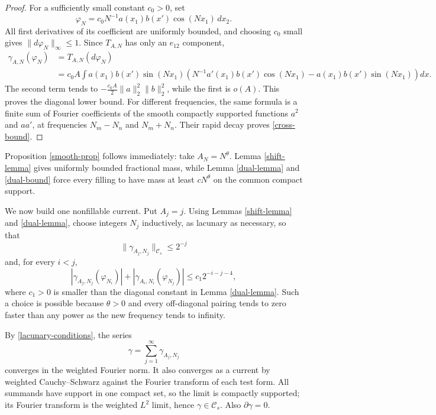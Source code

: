 \documentclass[11pt]{article}
\newcommand{\Cs}{\mathcal{C}_s}
\begin{document}
\begin{proof}
For a sufficiently small constant $c_0>0$, set
\[
 \varphi_N=c_0N^{-1}a(x_1)b(x')\cos(Nx_1)\,dx_2.
\]
All first derivatives of its coefficient are uniformly bounded, and choosing
$c_0$ small gives $\|d\varphi_N\|_\infty\le1$.  Since $T_{A,N}$ has only an
$e_{12}$ component,
\begin{align*}
 \gamma_{A,N}(\varphi_N)
 &=T_{A,N}(d\varphi_N)\\
 &=c_0A\int a(x_1)b(x')\sin(Nx_1)
 \left(N^{-1}a'(x_1)b(x')\cos(Nx_1)
       -a(x_1)b(x')\sin(Nx_1)\right)dx.
\end{align*}
The second term tends to
$-\frac{c_0A}{2}\|a\|_2^2\|b\|_2^2$, while the first is $o(A)$.
This proves the diagonal lower bound.  For different frequencies, the same
formula is a finite sum of Fourier coefficients of the smooth compactly
supported functions $a^2$ and $aa'$, at frequencies
$N_m-N_n$ and $N_m+N_n$.  Their rapid decay proves
\eqref{cross-bound}.
\end{proof}

Proposition \ref{smooth-prop} follows immediately: take
$A_N=N^\theta$.  Lemma \ref{shift-lemma} gives uniformly bounded fractional
mass, while Lemma \ref{dual-lemma} and \eqref{dual-bound} force every filling
to have mass at least $cN^\theta$ on the common compact support.

We now build one nonfillable current.  Put $A_j=j$.  Using Lemmas
\ref{shift-lemma} and \ref{dual-lemma}, choose integers $N_j$ inductively, as
lacunary as necessary, so that
\begin{equation}\label{lacunary-conditions}
 \|\gamma_{A_j,N_j}\|_{\Cs}\le2^{-j}
\end{equation}
and, for every $i<j$,
\begin{equation}\label{cross-small}
 |\gamma_{A_j,N_j}(\varphi_{N_i})|
 +|\gamma_{A_i,N_i}(\varphi_{N_j})|
 \le c_1 2^{-i-j-4},
\end{equation}
where $c_1>0$ is smaller than the diagonal constant in Lemma
\ref{dual-lemma}.  Such a choice is possible because $\theta>0$ and every
off-diagonal pairing tends to zero faster than any power as the new frequency
tends to infinity.

By \eqref{lacunary-conditions}, the series
\[
 \gamma=\sum_{j=1}^\infty\gamma_{A_j,N_j}
\]
converges in the weighted Fourier norm.  It also converges as a current by
weighted Cauchy--Schwarz against the Fourier transform of each test form.  All
summands have support in one compact set, so the limit is compactly supported;
its Fourier transform is the weighted $L^2$ limit, hence $\gamma\in\Cs$.
Also $\partial\gamma=0$.
\end{document}
